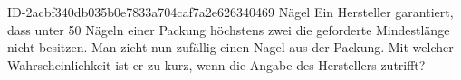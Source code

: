 \begin{exercise}
      {ID-2acbf340db035b0e7833a704caf7a2e626340469}
      {Nägel}
  \ifproblem\problem
    Ein Hersteller garantiert, dass unter 50 Nägeln einer Packung höchstens zwei
    die geforderte Mindestlänge nicht besitzen. Man zieht nun zufällig einen
    Nagel aus der Packung. Mit welcher Wahrscheinlichkeit ist er zu kurz, wenn
    die Angabe des Herstellers zutrifft?
  \fi
\end{exercise}
